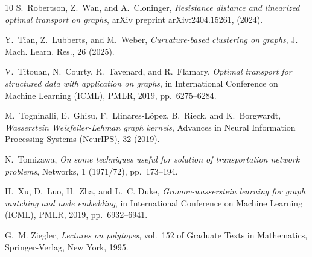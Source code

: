 \documentclass[11pt,a4paper]{article}
\begin{document}
\begin{thebibliography}{10}
{\sc S.~Robertson, Z.~Wan, and A.~Cloninger}, {\em Resistance distance and linearized optimal transport on graphs}, arXiv preprint arXiv:2404.15261,  (2024).

{\sc Y.~Tian, Z.~Lubberts, and M.~Weber}, {\em Curvature-based clustering on graphs}, J. Mach. Learn. Res., 26 (2025).

{\sc V.~Titouan, N.~Courty, R.~Tavenard, and R.~Flamary}, {\em Optimal transport for structured data with application on graphs}, in International {C}onference on {M}achine {L}earning ({ICML}), PMLR, 2019, pp.~6275--6284.

{\sc M.~Togninalli, E.~Ghisu, F.~Llinares-L{\'o}pez, B.~Rieck, and K.~Borgwardt}, {\em Wasserstein {W}eisfeiler-{L}ehman graph kernels}, Advances in {N}eural {I}nformation {P}rocessing {S}ystems ({NeurIPS}), 32 (2019).

{\sc N.~Tomizawa}, {\em On some techniques useful for solution of transportation network problems}, Networks, 1 (1971/72), pp.~173--194.

{\sc H.~Xu, D.~Luo, H.~Zha, and L.~C. Duke}, {\em Gromov-wasserstein learning for graph matching and node embedding}, in International {C}onference on {M}achine {L}earning ({ICML}), PMLR, 2019, pp.~6932--6941.

{\sc G.~M. Ziegler}, {\em Lectures on polytopes}, vol.~152 of Graduate Texts in Mathematics, Springer-Verlag, New York, 1995.

\end{thebibliography}
\end{document}
